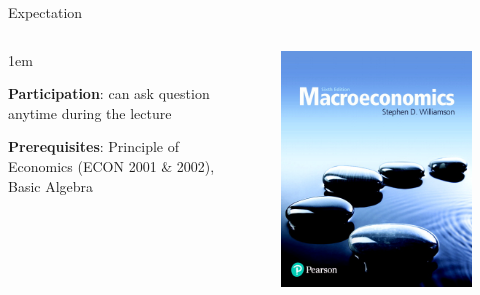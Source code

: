 \documentclass[11pt,aspectratio=43]{beamer}
\let\olditemize=\itemize
\let\endolditemize=\enditemize
\renewenvironment{itemize}{\olditemize \itemsep1em}{\endolditemize}
\theoremstyle{definition}
\begin{document}
\begin{frame}{Expectation}
\label{slide:Expectation}
    \begin{columns}
        \begin{column}{0.6\textwidth}
            \begin{itemize}
                \item \textbf{Participation}: can ask question anytime during the lecture
                \item \textbf{Prerequisites}: \alert{Principle of Economics}
                        (ECON 2001 \& 2002),
                        Basic Algebra
            \end{itemize}
        \end{column}
        \begin{column}{0.4\textwidth}
            \begin{figure}
                \includegraphics[width=\textwidth]{./figures/Williamson.jpg}

\end{figure}
\end{column}
\end{columns}
\end{frame}
\end{document}
